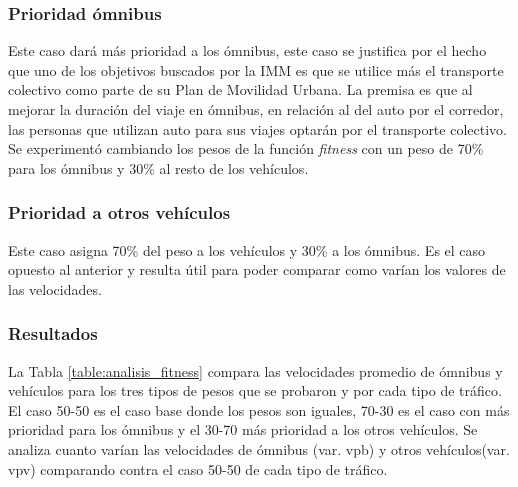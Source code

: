 

\subsubsection{Prioridad ómnibus}
Este caso dará más prioridad a los ómnibus, este caso se justifica por el hecho que uno de los objetivos buscados por la IMM es que se utilice más el transporte colectivo como parte de su Plan de Movilidad Urbana. La premisa es que al mejorar la duración del viaje en ómnibus, en relación al del auto por el corredor, las personas que utilizan auto para sus viajes optarán por el transporte colectivo. Se experimentó cambiando los pesos de la función \emph{fitness} con un peso de 70\% para los ómnibus y 30\% al resto de los vehículos.


\subsubsection{Prioridad a otros vehículos}

Este caso asigna 70\% del peso a los vehículos y 30\% a los ómnibus. Es el caso opuesto al anterior y resulta útil para poder comparar como varían los valores de las velocidades.

\subsubsection{Resultados}

La Tabla \ref{table:analisis_fitness} compara las velocidades promedio de ómnibus y vehículos para los tres tipos de pesos que se probaron y por cada tipo de tráfico.  El caso 50-50 es el caso base donde los pesos son iguales, 70-30 es el caso con más prioridad para los ómnibus y el 30-70 más prioridad a los otros vehículos. Se analiza cuanto varían las velocidades de ómnibus (var. vpb) y otros vehículos(var. vpv) comparando contra el caso 50-50 de cada tipo de tráfico.


